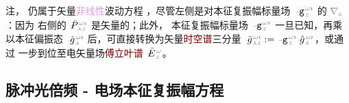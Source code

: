 注， 仍属于矢量\textcolor{Plum}{非线性}波动方程 ，尽管左侧是对\textcolor{PineGreen}{本征复振幅}标量场 $\xint{\begin{smallmatrix} ~ \\ {}^{}_{\mathcolor{gray}{-}} \\ ~ \end{smallmatrix}}{09}{\mathtt{g}}^{\;\!\mathcolor{gray}{\omega} \textcolor{PineGreen}{\imath}}_{\;\! \mathcolor{gray}{z}}$ 的 $\mathcolor{gray}{\nabla_z}$：因为 {\one} 右侧的 $\xint{\mathcolor{gray}{-}}{25}{\bar{P}}^{\;\! \mathcolor{gray}{\omega} \textcolor{PineGreen}{\imath}}_{\;\! \textcolor{Maroon}{\Yup} \mathcolor{gray}{z}}$ 是矢量的；此外，{\two} \textcolor{PineGreen}{本征复振幅}标量场 $\xint{\begin{smallmatrix} ~ \\ {}^{}_{\mathcolor{gray}{-}} \\ ~ \end{smallmatrix}}{09}{\mathtt{g}}^{\;\!\mathcolor{gray}{\omega} \textcolor{PineGreen}{\imath}}_{\;\! \mathcolor{gray}{z}}$ 一旦已知，再乘以\textcolor{PineGreen}{本征偏振态} $\xint{{}^{}_{\mathcolor{gray}{-}}}{10}{\hat{g}}^{\;\!\mathcolor{gray}{\omega} \textcolor{PineGreen}{\imath}}_{\;\! \textcolor{Maroon}{\Yup}}$ 后，可直接转换为矢量\textcolor{Maroon}{时空谱}三分量 $\xint{{}^{}_{\mathcolor{gray}{-}}}{10}{\bar{g}}^{\;\!\mathcolor{gray}{\omega} \textcolor{PineGreen}{\imath}}_{\;\! \textcolor{Maroon}{\Yup} \mathcolor{gray}{z}} := \xint{\begin{smallmatrix} ~ \\ {}^{}_{\mathcolor{gray}{-}} \\ ~ \end{smallmatrix}}{09}{\mathtt{g}}^{\;\!\mathcolor{gray}{\omega} \textcolor{PineGreen}{\imath}}_{\;\! \mathcolor{gray}{z}} \xint{{}^{}_{\mathcolor{gray}{-}}}{10}{\hat{g}}^{\;\!\mathcolor{gray}{\omega} \textcolor{PineGreen}{\imath}}_{\;\! \textcolor{Maroon}{\Yup}}$，或通过  一步到位至电矢量场\textcolor{Maroon}{傅立叶谱} $\xint{\mathcolor{gray}{-}}{25}{\bar{E}}^{\;\!\mathcolor{gray}{\omega}}_{\;\! \mathcolor{gray}{z}}$。

\subsection{脉冲光倍频 - 电场本征复振幅方程}\label{ssec:SHG_spectrum}

